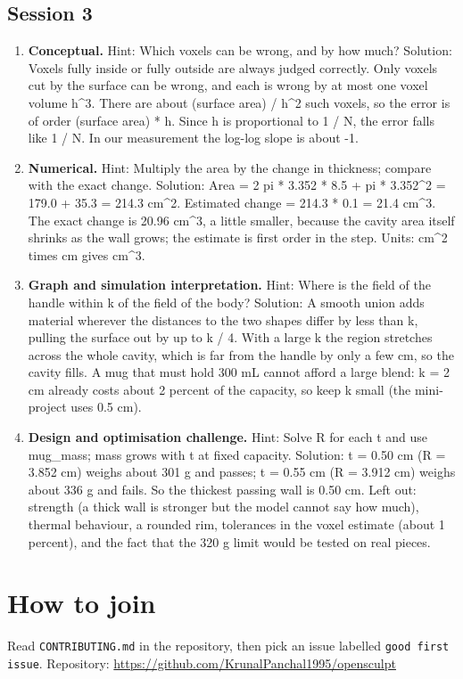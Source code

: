 \documentclass[11pt,a4paper]{article}
\begin{document}
\subsection*{Session 3}
\begin{enumerate}[nosep]
\item \textbf{Conceptual.} Hint: Which voxels can be wrong, and by how much? Solution: Voxels fully inside or fully outside are always judged correctly. Only voxels cut by the surface can be wrong, and each is wrong by at most one voxel volume h\textasciicircum{}3. There are about (surface area) / h\textasciicircum{}2 such voxels, so the error is of order (surface area) * h. Since h is proportional to 1 / N, the error falls like 1 / N. In our measurement the log-log slope is about -1.
\item \textbf{Numerical.} Hint: Multiply the area by the change in thickness; compare with the exact change. Solution: Area = 2 pi * 3.352 * 8.5 + pi * 3.352\textasciicircum{}2 = 179.0 + 35.3 = 214.3 cm\textasciicircum{}2. Estimated change = 214.3 * 0.1 = 21.4 cm\textasciicircum{}3. The exact change is 20.96 cm\textasciicircum{}3, a little smaller, because the cavity area itself shrinks as the wall grows; the estimate is first order in the step. Units: cm\textasciicircum{}2 times cm gives cm\textasciicircum{}3.
\item \textbf{Graph and simulation interpretation.} Hint: Where is the field of the handle within k of the field of the body? Solution: A smooth union adds material wherever the distances to the two shapes differ by less than k, pulling the surface out by up to k / 4. With a large k the region stretches across the whole cavity, which is far from the handle by only a few cm, so the cavity fills. A mug that must hold 300 mL cannot afford a large blend: k = 2 cm already costs about 2 percent of the capacity, so keep k small (the mini-project uses 0.5 cm).
\item \textbf{Design and optimisation challenge.} Hint: Solve R for each t and use mug\_mass; mass grows with t at fixed capacity. Solution: t = 0.50 cm (R = 3.852 cm) weighs about 301 g and passes; t = 0.55 cm (R = 3.912 cm) weighs about 336 g and fails. So the thickest passing wall is 0.50 cm. Left out: strength (a thick wall is stronger but the model cannot say how much), thermal behaviour, a rounded rim, tolerances in the voxel estimate (about 1 percent), and the fact that the 320 g limit would be tested on real pieces.
\end{enumerate}

\section{How to join}
Read \texttt{CONTRIBUTING.md} in the repository, then pick an issue labelled \texttt{good first issue}. Repository: \url{https://github.com/KrunalPanchal1995/opensculpt}
\end{document}

